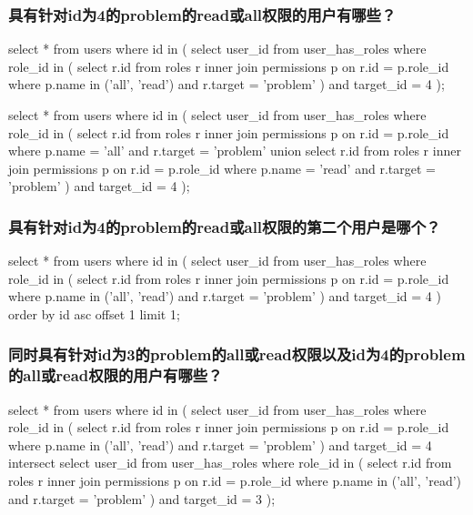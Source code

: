 \documentclass{ctexrep}
\begin{document}
\subsubsection*{具有针对id为4的problem的read或all权限的用户有哪些？}
\begin{run}
    select * from users where id in (
        select user_id from user_has_roles where role_id in (
            select r.id from roles r 
            inner join permissions p on r.id = p.role_id 
            where p.name in ('all', 'read') and r.target = 'problem'
        ) and target_id = 4
    );
\end{run}
\begin{run}
    select * from users where id in (
        select user_id from user_has_roles where role_id in (
            select r.id from roles r 
            inner join permissions p on r.id = p.role_id 
            where p.name = 'all' and r.target = 'problem'
            union
            select r.id from roles r 
            inner join permissions p on r.id = p.role_id 
            where p.name = 'read' and r.target = 'problem'
        ) and target_id = 4
    );
\end{run}
\subsubsection*{具有针对id为4的problem的read或all权限的第二个用户是哪个？}
\begin{run}
    select * from users where id in (
        select user_id from user_has_roles where role_id in (
            select r.id from roles r 
            inner join permissions p on r.id = p.role_id 
            where p.name in ('all', 'read') and r.target = 'problem'
        ) and target_id = 4
    ) order by id asc offset 1 limit 1;
\end{run}
\subsubsection*{同时具有针对id为3的problem的all或read权限以及id为4的problem的all或read权限的用户有哪些？}
\begin{run}
    select * from users where id in (
        select user_id from user_has_roles where role_id in (
            select r.id from roles r 
            inner join permissions p on r.id = p.role_id 
            where p.name in ('all', 'read') and r.target = 'problem'
        ) and target_id = 4
        intersect
        select user_id from user_has_roles where role_id in (
            select r.id from roles r 
            inner join permissions p on r.id = p.role_id 
            where p.name in ('all', 'read') and r.target = 'problem'
        ) and target_id = 3
    );
\end{run}
\end{document}
